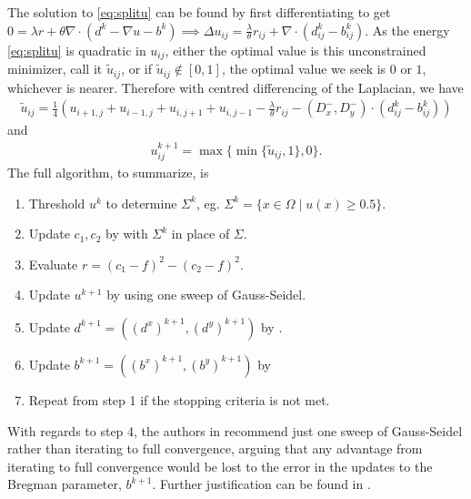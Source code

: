 The solution to \eqref{eq:splitu} can be found by first differentiating to get $0 = \lambda r  +\theta  \nabla \cdot ( d^k - \nabla u - b^k) \implies \Delta u_{ij} = \frac{\lambda}{\theta} r_{ij} + \nabla \cdot (d^k_{ij} - b^k_{ij})$. As the energy \eqref{eq:splitu} is quadratic in $u_{ij}$, either the optimal value is this unconstrained minimizer, call it $\widetilde u_{ij}$, or if $\widetilde{u}_{ij} \notin [0,1]$, the optimal value we seek is $0$ or $1$, whichever is nearer. Therefore with centred differencing of the Laplacian, we have 
\begin{align}
\widetilde u_{ij} = \frac{1}{4}\left(
u_{i+1,j} + u_{i-1,j} + u_{i,j+1} + u_{i,j-1} 
- \frac{\lambda}{\theta} r_{ij}
-  (D^-_x, D^-_y) \cdot  (d^k_{ij} - b^k_{ij} )
\right) 
\label{eq:sbuij}
\end{align}
and 
\begin{align}
u_{ij}^{k+1}  = \max \{ \min\{ \widetilde u_{ij}, 1 \} , 0 \}.
\label{eq:sbuij2}
\end{align}
The full algorithm, to summarize, is
\begin{enumerate}
	\item Threshold $u^k$ to determine $\Sigma^k$, eg. $\Sigma^k = \{x\in\Omega \mid u(x) \geq 0.5 \}$.
	\item Update $c_1, c_2$ by  with $\Sigma^k$ in place of $\Sigma$.
	
	\item Evaluate $r = (c_1- f)^2 - (c_2 - f)^2$.

	\item Update $u^{k+1}$ by  using one sweep of Gauss-Seidel.
	
	\item Update $d^{k+1} = ((d^x)^{k+1}, (d^y)^{k+1})$ by .
	
	\item Update $b^{k+1} = ((b^x)^{k+1}, (b^y)^{k+1})$ by 
	
	\item Repeat from step 1 if the stopping criteria is not met.
\end{enumerate}
With regards to step 4, the authors in \cite{goldstein2010geometric} recommend just one sweep of Gauss-Seidel rather than iterating to full convergence, arguing that any advantage from iterating to full convergence would be lost to the error in the updates to the Bregman parameter, $b^{k+1}$. Further justification can be found in \cite{yin2013error}.


